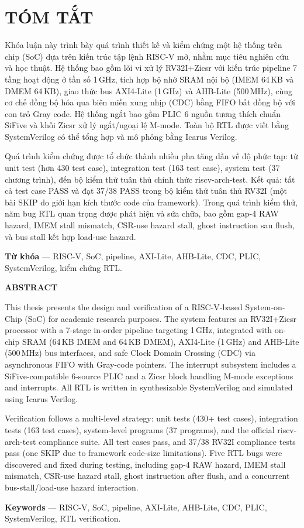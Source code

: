 \chapter*{TÓM TẮT}
\label{tomtat}

Khóa luận này trình bày quá trình thiết kế và kiểm chứng một hệ thống trên chip (SoC) dựa trên kiến trúc tập lệnh RISC-V mở, nhằm mục tiêu nghiên cứu và học thuật. Hệ thống bao gồm lõi vi xử lý RV32I+Zicsr với kiến trúc pipeline 7 tầng hoạt động ở tần số 1\,GHz, tích hợp bộ nhớ SRAM nội bộ (IMEM 64\,KB và DMEM 64\,KB), giao thức bus AXI4-Lite (1\,GHz) và AHB-Lite (500\,MHz), cùng cơ chế đồng bộ hóa qua biên miền xung nhịp (CDC) bằng FIFO bất đồng bộ với con trỏ Gray code. Hệ thống ngắt bao gồm PLIC 6 nguồn tương thích chuẩn SiFive và khối Zicsr xử lý ngắt/ngoại lệ M-mode. Toàn bộ RTL được viết bằng SystemVerilog có thể tổng hợp và mô phỏng bằng Icarus Verilog.

Quá trình kiểm chứng được tổ chức thành nhiều pha tăng dần về độ phức tạp: từ unit test (hơn 430 test case), integration test (163 test case), system test (37 chương trình), đến bộ kiểm thử tuân thủ chính thức riscv-arch-test. Kết quả: tất cả test case PASS và đạt 37/38 PASS trong bộ kiểm thử tuân thủ RV32I (một bài SKIP do giới hạn kích thước code của framework). Trong quá trình kiểm thử, năm bug RTL quan trọng được phát hiện và sửa chữa, bao gồm gap-4 RAW hazard, IMEM stall mismatch, CSR-use hazard stall, ghost instruction sau flush, và bus stall kết hợp load-use hazard.

\textbf{Từ khóa} --- RISC-V, SoC, pipeline, AXI-Lite, AHB-Lite, CDC, PLIC, SystemVerilog, kiểm chứng RTL.

\begin{center}
    \textbf{ABSTRACT}
\end{center}

This thesis presents the design and verification of a RISC-V-based System-on-Chip (SoC) for academic research purposes. The system features an RV32I+Zicsr processor with a 7-stage in-order pipeline targeting 1\,GHz, integrated with on-chip SRAM (64\,KB IMEM and 64\,KB DMEM), AXI4-Lite (1\,GHz) and AHB-Lite (500\,MHz) bus interfaces, and safe Clock Domain Crossing (CDC) via asynchronous FIFO with Gray-code pointers. The interrupt subsystem includes a SiFive-compatible 6-source PLIC and a Zicsr block handling M-mode exceptions and interrupts. All RTL is written in synthesizable SystemVerilog and simulated using Icarus Verilog.

Verification follows a multi-level strategy: unit tests (430+ test cases), integration tests (163 test cases), system-level programs (37 programs), and the official riscv-arch-test compliance suite. All test cases pass, and 37/38 RV32I compliance tests pass (one SKIP due to framework code-size limitations). Five RTL bugs were discovered and fixed during testing, including gap-4 RAW hazard, IMEM stall mismatch, CSR-use hazard stall, ghost instruction after flush, and a concurrent bus-stall/load-use hazard interaction.

\textbf{Keywords} --- RISC-V, SoC, pipeline, AXI-Lite, AHB-Lite, CDC, PLIC, SystemVerilog, RTL verification.
